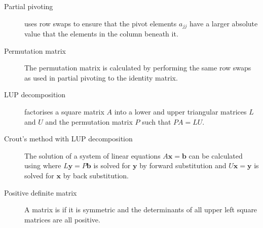 \documentclass[letterpaper,10pt,english]{jupyterBook}
\begin{document}
\begin{description}
\item[{Partial pivoting\label{\detokenize{8_Appendices/8.0_Cheat_sheet:term-Partial-pivoting}}}] \leavevmode
\sphinxAtStartPar
{\hyperref[\detokenize{6_Direct_methods/6.2_LUP_decomposition:partial-pivoting-section}]{}} uses row swaps to ensure that the pivot elements \(a_{jj}\) have a larger absolute value that the elements in the column beneath it.

\item[{Permutation matrix\label{\detokenize{8_Appendices/8.0_Cheat_sheet:term-Permutation-matrix}}}] \leavevmode
\sphinxAtStartPar
The permutation matrix is calculated by performing the same row swaps as used in partial pivoting to the identity matrix.

\item[{LUP decomposition\label{\detokenize{8_Appendices/8.0_Cheat_sheet:term-LUP-decomposition}}}] \leavevmode
\sphinxAtStartPar
{\hyperref[\detokenize{6_Direct_methods/6.2_LUP_decomposition:lup-decomposition-section}]{}} factorises a square matrix \(A\) into a lower and upper triangular matrices \(L\) and \(U\) and the permutation matrix \(P\) such that \(PA = LU\).

\item[{Crout’s method with LUP decomposition\label{\detokenize{8_Appendices/8.0_Cheat_sheet:term-Crout-s-method-with-LUP-decomposition}}}] \leavevmode
\sphinxAtStartPar
The solution of a system of linear equations \(A \mathbf{x} = \mathbf{b}\) can be calculated using {\hyperref[\detokenize{6_Direct_methods/6.2_LUP_decomposition:lup-decomposition-section}]{}} where \(L \mathbf{y} = P \mathbf{b}\) is solved for \(\mathbf{y}\) by forward substitution and \(U \mathbf{x} = \mathbf{y}\) is solved for \(\mathbf{x}\) by back substitution.

\item[{Positive definite matrix\label{\detokenize{8_Appendices/8.0_Cheat_sheet:term-Positive-definite-matrix}}}] \leavevmode
\sphinxAtStartPar
A matrix is {\hyperref[\detokenize{6_Direct_methods/6.3_Cholesky_decomposition:cholesky-section}]{}} if it is symmetric and the determinants of all upper left square matrices are all positive.


\end{description}
\end{document}
